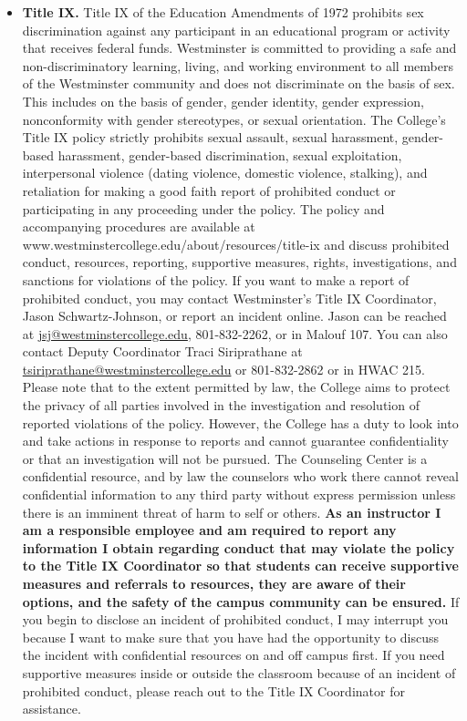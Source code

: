 \documentclass[11pt, a4paper]{article}
\begin{document}
\begin{itemize}
\item \textbf{Title IX.} Title IX of the Education Amendments of 1972 prohibits sex discrimination against any participant in an educational program or activity that receives federal funds. Westminster is committed to providing a safe and non-discriminatory learning, living, and working environment to all members of the Westminster community and does not discriminate on the basis of sex. This includes on the basis of gender, gender identity, gender expression, nonconformity with gender stereotypes, or sexual orientation. The College's Title IX policy strictly prohibits sexual assault, sexual harassment, gender-based harassment, gender-based discrimination, sexual exploitation, interpersonal violence (dating violence, domestic violence, stalking), and retaliation for making a good faith report of prohibited conduct or participating in any proceeding under the policy. The policy and accompanying procedures are available at www.westminstercollege.edu/about/resources/title-ix and discuss prohibited conduct, resources, reporting, supportive measures, rights, investigations, and sanctions for violations of the policy. If you want to make a report of prohibited conduct, you may contact Westminster's Title IX Coordinator, Jason Schwartz-Johnson, or report an incident online. Jason can be reached at \href{mailto:jsj@westminstercollege.edu}{jsj@westminstercollege.edu}, 801-832-2262, or in Malouf 107. You can also contact Deputy Coordinator Traci Siriprathane at \href{mailto:tsiriprathane@westminstercollege.edu}{tsiriprathane@westminstercollege.edu} or 801-832-2862 or in HWAC 215. Please note that to the extent permitted by law, the College aims to protect the privacy of all parties involved in the investigation and resolution of reported violations of the policy. However, the College has a duty to look into and take actions in response to reports and cannot guarantee confidentiality or that an investigation will not be pursued. The Counseling Center is a confidential resource, and by law the counselors who work there cannot reveal confidential information to any third party without express permission unless there is an imminent threat of harm to self or others. \textbf{As an instructor I am a responsible employee and am required to report any information I obtain regarding conduct that may violate the policy to the Title IX Coordinator so that students can receive supportive measures and referrals to resources, they are aware of their options, and the safety of the campus community can be ensured.} If you begin to disclose an incident of prohibited conduct, I may interrupt you because I want to make sure that you have had the opportunity to discuss the incident with confidential resources on and off campus first. If you need supportive measures inside or outside the classroom because of an incident of prohibited conduct, please reach out to the Title IX Coordinator for assistance.

\end{itemize}
\end{document}
